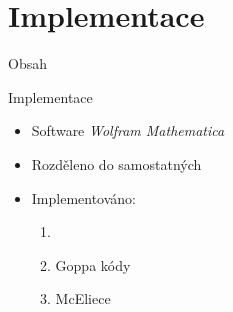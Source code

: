 \documentclass{beamer}
\begin{document}
\section{Implementace}
\begin{frame}{Obsah}
    \tableofcontents[currentsection]
\end{frame}

\begin{frame}{Implementace}

    \begin{itemize}
        \item Software \emph{Wolfram Mathematica}
        \item Rozděleno do samostatných 

            \pause
        \item Implementováno:
            \begin{enumerate}
                \item {}
                \item Goppa kódy
                \item McEliece
            \end{enumerate}
    \end{itemize}

\end{frame}
\end{document}

